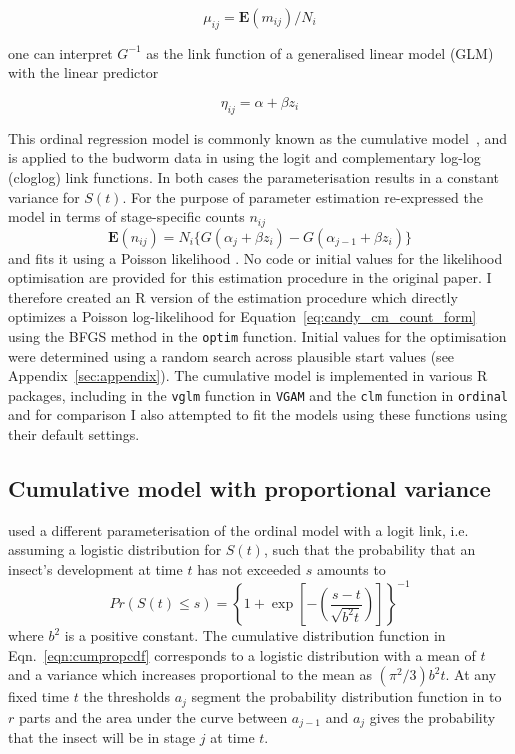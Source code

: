 $$\mu_{ij} = \mathbf{E}(m_{ij})/N_i$$

 one can interpret $G^{-1}$ as the link function of a generalised linear model (GLM) with the linear predictor 

$$\eta_{ij}=\alpha+\beta z_i$$

This ordinal regression model is commonly known as the cumulative model~\citep{burkner2019ordinal}, and is applied to the budworm data in \citep{candy1991modeling} using the logit and complementary log-log (cloglog) link functions. 
In both cases the parameterisation results in a constant variance for $S(t)$.
For the purpose of parameter estimation \citet{candy1991modeling} re-expressed the model in terms of stage-specific counts $n_{ij}$  
\begin{equation}
\mathbf{E}(n_{ij})=N_i\{G(\alpha_j + \beta z_i) - G(\alpha_{j-1} + \beta z_i)\}
\label{eq:candy_cm_count_form}
\end{equation}
and fits it using a Poisson likelihood \citep{thompson1981composite}. 
No code or initial values for the likelihood optimisation are provided for this estimation procedure in the original paper.   
I therefore created an R version of the estimation procedure which directly optimizes a Poisson log-likelihood for Equation~\ref{eq:candy_cm_count_form} using the BFGS method in the \verb+optim+ function.
Initial values for the optimisation were determined using a random search across plausible start values (see Appendix~\ref{sec:appendix}).
 The cumulative model is implemented in various R packages, including in the \verb+vglm+ function in \verb+VGAM+ \citep{VGAM} and the \verb+clm+ function in \verb+ordinal+ \cite{ordinal} and for comparison I also attempted to fit the models using these functions using their default settings.

\subsection{Cumulative model with proportional variance}
\citet{dennis1986stochastic} used a different parameterisation of the ordinal model with a logit link, i.e. assuming a logistic distribution for $S(t)$, such that the probability that an insect's development at time $t$ has not exceeded $s$ amounts to 
\begin{equation}
Pr(S(t) \leq s) = \left\{ 1 + \exp\left[-\left(\frac{s-t}{\sqrt{b^2t}}\right)\right]\right\}^{-1}
\label{eqn:cumpropcdf}
\end{equation}
where $b^2$ is a positive constant. 
The cumulative distribution function in Eqn.~\ref{eqn:cumpropcdf} corresponds to a logistic distribution with a mean of $t$ and a variance which increases proportional to the mean as $(\pi^2/3)b^2t$.
At any fixed time $t$ the thresholds $a_j$ segment the probability distribution function in to $r$ parts and the area under the curve between $a_{j-1}$ and $a_j$ gives the probability that the insect will be in stage $j$ at time $t$.

